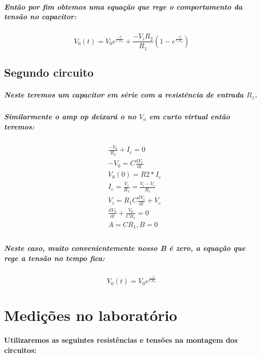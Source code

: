 \documentclass[12pt,twoside, a4paper, twocolumn]{article}
\newcommand\deriv[2]{\frac{\mathrm d #1}{\mathrm d #2}}
\begin{document}
\subparagraph*{Então por fim obtemos uma equação que rege o comportamento da tensão no capacitor:}

\begin{equation}
    V_0(t) = V_0 e^{\frac{-t}{C R_2}} + \frac{-V_i R_2}{R_1}(1- e^{\frac{-t}{C R_2}})
\end{equation}

\subsection{Segundo circuito}

\subparagraph*{Neste teremos um capacitor em série com a resistência de entrada $R_1$.}

\subparagraph*{Similarmente o amp op deixará o no $V_a$ em curto virtual então teremos:}

\begin{equation}
    \begin{aligned}
         & \frac{-V_0}{R_2} + I_c = 0                    \\
         & -V_0 = C \deriv{V_c}{t}                       \\
         & V_0(0) = R2 * I_c                             \\
         & I_c = \frac{V_r}{R_1} = \frac{V_i - V_c}{R_1} \\
         & V_i = R_1 C \deriv{V_c}{t} + V_c              \\
         & \deriv{V_0}{t} + \frac{V_0}{C R_1} = 0        \\
         & A = C R_1 , B = 0                             \\
    \end{aligned}
\end{equation}

\subparagraph*{Neste caso, muito convenientemente nosso B é zero, a equação que rege a tensão no tempo fica:}

\begin{equation}
    V_0(t) = V_0 e^{\frac{-t}{C R_1}}
\end{equation}


\section{Medições no laboratório}

\paragraph*{Utilizaremos as seguintes resistências e tensões na montagem dos circuitos:}
\end{document}
